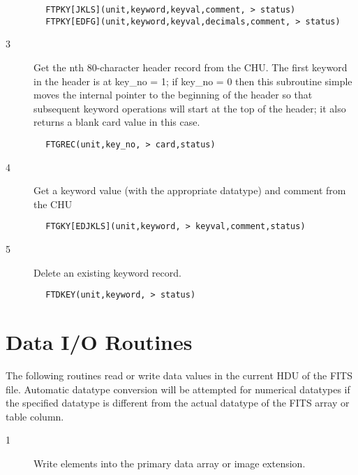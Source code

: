 \documentclass[11pt]{book}
\begin{document}
\begin{verbatim}
        FTPKY[JKLS](unit,keyword,keyval,comment, > status)
        FTPKY[EDFG](unit,keyword,keyval,decimals,comment, > status)
\end{verbatim}

\begin{description}
\item[3 ]Get the nth 80-character header record from the CHU.  The first keyword
   in the header is at key\_no = 1;  if key\_no = 0 then this subroutine
   simple moves the internal pointer to the beginning of the header
   so that subsequent keyword operations will start at the top of
  the header; it also returns a blank card value in this case.
\end{description}

\begin{verbatim}
        FTGREC(unit,key_no, > card,status)
\end{verbatim}

\begin{description}
\item[4 ] Get a keyword value (with the appropriate datatype) and comment from
   the CHU
\end{description}

\begin{verbatim}
        FTGKY[EDJKLS](unit,keyword, > keyval,comment,status)
\end{verbatim}

\begin{description}
\item[5 ] Delete an existing keyword record.
\end{description}

\begin{verbatim}
        FTDKEY(unit,keyword, > status)
\end{verbatim}


\section{Data I/O Routines}

The following routines read or write data values in the current HDU of
the FITS file.  Automatic datatype conversion
will be attempted for numerical datatypes if the specified datatype is
different from the actual datatype of the FITS array or table column.


\begin{description}
\item[1 ]Write elements into the primary data array or image extension.
\end{description}
\end{document}
